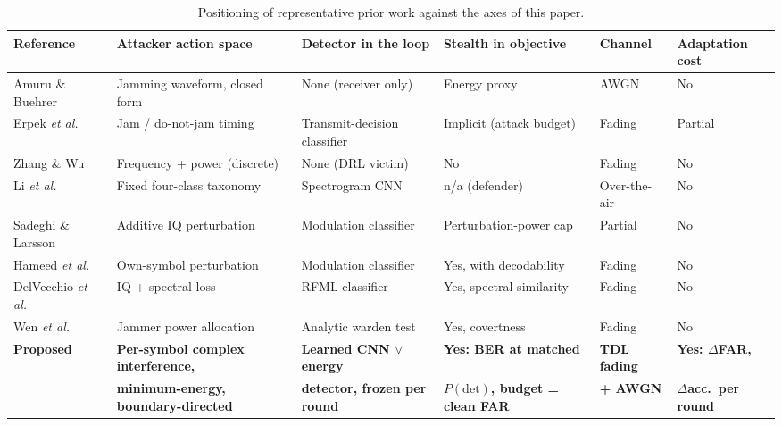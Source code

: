\begin{table}[!t]
\renewcommand{\arraystretch}{1.2}
\caption{Positioning of representative prior work against the axes of this paper.}
\label{tab:related}
\centering
\footnotesize
\begin{tabular}{@{}llllll@{}}
\hline\hline
\textbf{Reference} & \textbf{Attacker action space} & \textbf{Detector in the loop} & \textbf{Stealth in objective} & \textbf{Channel} & \textbf{Adaptation cost} \\
\hline
Amuru \& Buehrer~\cite{amuru2015optimal}      & Jamming waveform, closed form   & None (receiver only)          & Energy proxy              & AWGN            & No \\
Erpek \emph{et al.}~\cite{erpek2019deep}      & Jam / do-not-jam timing         & Transmit-decision classifier  & Implicit (attack budget)  & Fading          & Partial \\
Zhang \& Wu~\cite{zhang2025cooperative}       & Frequency + power (discrete)    & None (DRL victim)             & No                        & Fading          & No \\
Li \emph{et al.}~\cite{li2022jamming_ofdm}    & Fixed four-class taxonomy       & Spectrogram CNN               & n/a (defender)            & Over-the-air    & No \\
Sadeghi \& Larsson~\cite{sadeghi2019adversarial} & Additive IQ perturbation     & Modulation classifier         & Perturbation-power cap    & Partial         & No \\
Hameed \emph{et al.}~\cite{hameed2021offense} & Own-symbol perturbation         & Modulation classifier         & Yes, with decodability    & Fading          & No \\
DelVecchio \emph{et al.}~\cite{delvecchio2020spectral} & IQ + spectral loss     & RFML classifier               & Yes, spectral similarity  & Fading          & No \\
Wen \emph{et al.}~\cite{wen2025generative}    & Jammer power allocation         & Analytic warden test          & Yes, covertness           & Fading          & No \\
\hline
\textbf{Proposed} & \textbf{Per-symbol complex interference,} & \textbf{Learned CNN $\vee$ energy} & \textbf{Yes: BER at matched} & \textbf{TDL fading} & \textbf{Yes: $\Delta$FAR,} \\
                  & \textbf{minimum-energy, boundary-directed} & \textbf{detector, frozen per round} & \textbf{$P(\mathrm{det})$, budget = clean FAR} & \textbf{+ AWGN} & \textbf{$\Delta$acc.\ per round} \\
\hline\hline
\end{tabular}
\end{table}
